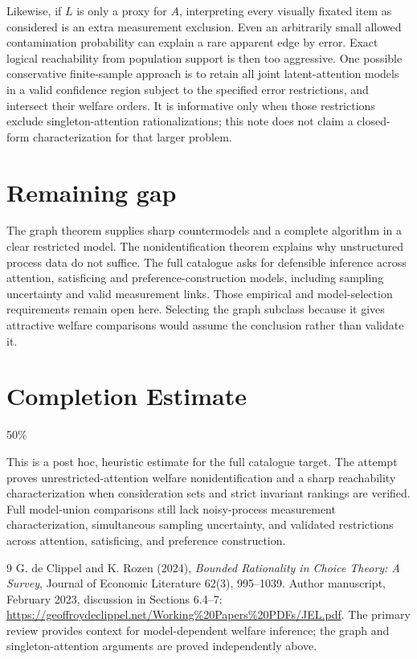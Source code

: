 \documentclass[11pt,a4paper]{article}
\begin{document}
Likewise, if $L$ is only a proxy for $A$, interpreting every visually fixated item as considered is an extra measurement exclusion. Even an arbitrarily small allowed contamination probability can explain a rare apparent edge by error. Exact logical reachability from population support is then too aggressive. One possible conservative finite-sample approach is to retain all joint latent-attention models in a valid confidence region subject to the specified error restrictions, and intersect their welfare orders. It is informative only when those restrictions exclude singleton-attention rationalizations; this note does not claim a closed-form characterization for that larger problem.

\section{Remaining gap}
The graph theorem supplies sharp countermodels and a complete algorithm in a clear restricted model. The nonidentification theorem explains why unstructured process data do not suffice. The full catalogue asks for defensible inference across attention, satisficing and preference-construction models, including sampling uncertainty and valid measurement links. Those empirical and model-selection requirements remain open here. Selecting the graph subclass because it gives attractive welfare comparisons would assume the conclusion rather than validate it.

\section{Completion Estimate}
50\%

This is a post hoc, heuristic estimate for the full catalogue target.
The attempt proves unrestricted-attention welfare nonidentification and a sharp reachability characterization when consideration sets and strict invariant rankings are verified. Full model-union comparisons still lack noisy-process measurement characterization, simultaneous sampling uncertainty, and validated restrictions across attention, satisficing, and preference construction.

\begin{thebibliography}{9}
 G. de Clippel and K. Rozen (2024), \emph{Bounded Rationality in Choice Theory: A Survey}, Journal of Economic Literature 62(3), 995--1039. Author manuscript, February 2023, discussion in Sections 6.4--7: \url{https://geoffroydeclippel.net/Working%20Papers%20PDFs/JEL.pdf}. The primary review provides context for model-dependent welfare inference; the graph and singleton-attention arguments are proved independently above.
\end{thebibliography}
\end{document}
